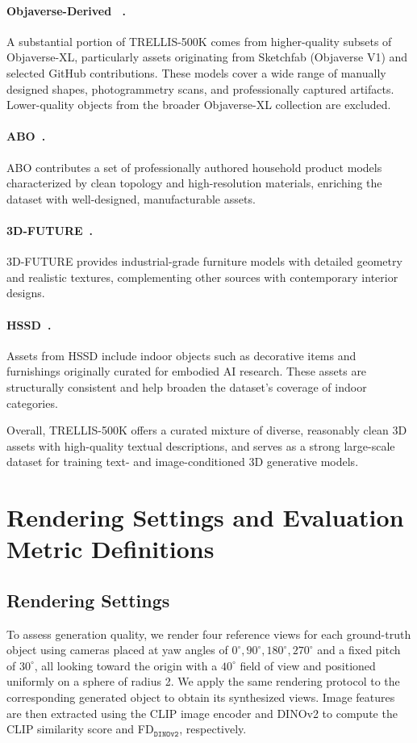 \paragraph{Objaverse-Derived ~\cite{deitke2023objaverse, deitke2024objaverse}.}
A substantial portion of TRELLIS-500K comes from higher-quality subsets of Objaverse-XL, particularly assets originating from Sketchfab (Objaverse V1) and selected GitHub contributions. These models cover a wide range of manually designed shapes, photogrammetry scans, and professionally captured artifacts. Lower-quality objects from the broader Objaverse-XL collection are excluded.

\paragraph{ABO~\cite{collins2022abo}.}
ABO contributes a set of professionally authored household product models characterized by clean topology and high-resolution materials, enriching the dataset with well-designed, manufacturable assets.

\paragraph{3D-FUTURE~\cite{fu20213d}.}
3D-FUTURE provides industrial-grade furniture models with detailed geometry and realistic textures, complementing other sources with contemporary interior designs.

\paragraph{HSSD~\cite{khanna2023hssd}.}
Assets from HSSD include indoor objects such as decorative items and furnishings originally curated for embodied AI research. These assets are structurally consistent and help broaden the dataset’s coverage of indoor categories.

Overall, TRELLIS-500K offers a curated mixture of diverse, reasonably clean 3D assets with high-quality textual descriptions, and serves as a strong large-scale dataset for training text- and image-conditioned 3D generative models.


\section{Rendering Settings and Evaluation Metric Definitions}
\subsection{Rendering Settings}
To assess generation quality, we render four reference views for each ground-truth object using cameras placed at yaw angles of ${0^\circ, 90^\circ, 180^\circ, 270^\circ}$ and a fixed pitch of $30^\circ$, all looking toward the origin with a $40^\circ$ field of view and positioned uniformly on a sphere of radius 2. We apply the same rendering protocol to the corresponding generated object to obtain its synthesized views. Image features are then extracted using the CLIP image encoder and DINOv2 to compute the CLIP similarity score and FD$_\texttt{DINOv2}$, respectively.

